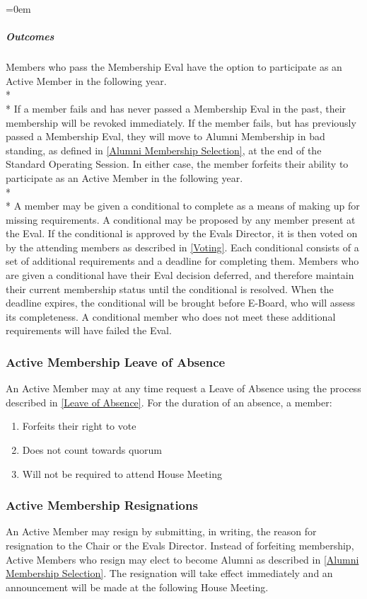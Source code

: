 \documentclass{article}
\newcommand{\asubsection}[1]{\subsubsection{#1} \label{#1}}
\newcommand{\asubsubsubsection}[1]{\parindent=0em\subparagraph{#1} \label{#1}}
\begin{document}
\asubsubsubsection{Outcomes}
Members who pass the Membership Eval have the option to participate as an Active Member in the following year.
\\* \\*
If a member fails and has never passed a Membership Eval in the past, their membership will be revoked immediately.
If the member fails, but has previously passed a Membership Eval, they will move to Alumni Membership in bad standing, as defined in \ref{Alumni Membership Selection}, at the end of the Standard Operating Session.
In either case, the member forfeits their ability to participate as an Active Member in the following year.
\\* \\*
A member may be given a conditional to complete as a means of making up for missing requirements.
A conditional may be proposed by any member present at the Eval.
If the conditional is approved by the Evals Director, it is then voted on by the attending members as described in \ref{Voting}.
Each conditional consists of a set of additional requirements and a deadline for completing them.
Members who are given a conditional have their Eval decision deferred, and therefore maintain their current membership status until the conditional is resolved.
When the deadline expires, the conditional will be brought before E-Board, who will assess its completeness.
A conditional member who does not meet these additional requirements will have failed the Eval.

\asubsection{Active Membership Leave of Absence}
\renewcommand{\theenumi}{\alph{enumi}} %

An Active Member may at any time request a Leave of Absence using the process described in \ref{Leave of Absence}.
For the duration of an absence, a member:
\begin{enumerate}
	\item Forfeits their right to vote
	\item Does not count towards quorum
	\item Will not be required to attend House Meeting
\end{enumerate}

\asubsection{Active Membership Resignations}
An Active Member may resign by submitting, in writing, the reason for resignation to the Chair or the Evals Director.
Instead of forfeiting membership, Active Members who resign may elect to become Alumni as described in \ref{Alumni Membership Selection}.
The resignation will take effect immediately and an announcement will be made at the following House Meeting.
\end{document}
